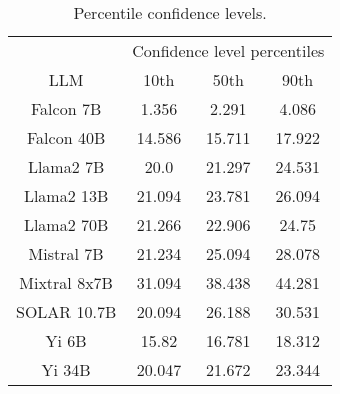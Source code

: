 \begin{table*}
\centering
\begin{tabular}{c|c|c|c}
& \multicolumn{3}{c}{Confidence level percentiles} \\ 
LLM & 10th & 50th & 90th\\ \hline
Falcon 7B & 1.356 & 2.291 & 4.086\\
Falcon 40B & 14.586 & 15.711 & 17.922\\
Llama2 7B & 20.0 & 21.297 & 24.531\\
Llama2 13B & 21.094 & 23.781 & 26.094\\
Llama2 70B & 21.266 & 22.906 & 24.75\\
Mistral 7B & 21.234 & 25.094 & 28.078\\
Mixtral 8x7B & 31.094 & 38.438 & 44.281\\
SOLAR 10.7B & 20.094 & 26.188 & 30.531\\
Yi 6B & 15.82 & 16.781 & 18.312\\
Yi 34B & 20.047 & 21.672 & 23.344\\
\hline
\end{tabular}
\caption{Percentile confidence levels.}
\label{tab:percentile_conf}
\end{table*}
